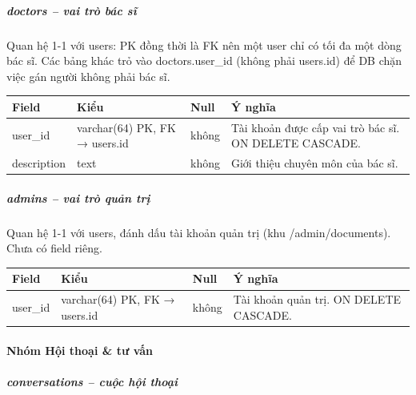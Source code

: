 \subparagraph{doctors -- vai trò bác sĩ}

Quan hệ 1-1 với users: PK đồng thời là FK nên một user chỉ có tối đa một dòng bác sĩ. Các bảng khác trỏ vào doctors.user\_id (không phải users.id) để DB chặn việc gán người không phải bác sĩ.
\begin{longtable}{|>{\raggedright\arraybackslash}p{0.250\dimexpr\linewidth-8\tabcolsep\relax}|>{\raggedright\arraybackslash}p{0.250\dimexpr\linewidth-8\tabcolsep\relax}|>{\raggedright\arraybackslash}p{0.250\dimexpr\linewidth-8\tabcolsep\relax}|>{\raggedright\arraybackslash}p{0.250\dimexpr\linewidth-8\tabcolsep\relax}|}
\hline
\textbf{Field} & \textbf{Kiểu} & \textbf{Null} & \textbf{Ý nghĩa} \\ \hline
\endhead
user\_id & varchar(64) PK, FK → users.id & không & Tài khoản được cấp vai trò bác sĩ. ON DELETE CASCADE. \\ \hline
description & text & không & Giới thiệu chuyên môn của bác sĩ. \\ \hline
\end{longtable}

\subparagraph{admins -- vai trò quản trị}

Quan hệ 1-1 với users, đánh dấu tài khoản quản trị (khu /admin/documents). Chưa có field riêng.
\begin{longtable}{|>{\raggedright\arraybackslash}p{0.250\dimexpr\linewidth-8\tabcolsep\relax}|>{\raggedright\arraybackslash}p{0.250\dimexpr\linewidth-8\tabcolsep\relax}|>{\raggedright\arraybackslash}p{0.250\dimexpr\linewidth-8\tabcolsep\relax}|>{\raggedright\arraybackslash}p{0.250\dimexpr\linewidth-8\tabcolsep\relax}|}
\hline
\textbf{Field} & \textbf{Kiểu} & \textbf{Null} & \textbf{Ý nghĩa} \\ \hline
\endhead
user\_id & varchar(64) PK, FK → users.id & không & Tài khoản quản trị. ON DELETE CASCADE. \\ \hline
\end{longtable}

\paragraph{Nhóm Hội thoại \& tư vấn}

\subparagraph{conversations -- cuộc hội thoại}


